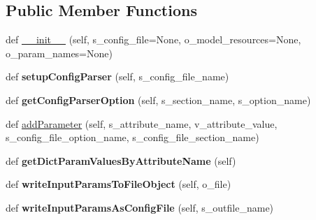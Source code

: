 \subsection*{Public Member Functions}
\begin{DoxyCompactItemize}
\item 
def \hyperlink{classnegui_1_1pginputsimupop_1_1PGInputSimuPop_a1452a83a005c9d30e778b34ae67a399f}{\+\_\+\+\_\+init\+\_\+\+\_\+} (self, s\+\_\+config\+\_\+file=None, o\+\_\+model\+\_\+resources=None, o\+\_\+param\+\_\+names=None)
\item 
def {\bfseries setup\+Config\+Parser} (self, s\+\_\+config\+\_\+file\+\_\+name)\hypertarget{classnegui_1_1pginputsimupop_1_1PGInputSimuPop_a3f1295816cd5e708646d49e1d4f3fb1c}{}\label{classnegui_1_1pginputsimupop_1_1PGInputSimuPop_a3f1295816cd5e708646d49e1d4f3fb1c}

\item 
def {\bfseries get\+Config\+Parser\+Option} (self, s\+\_\+section\+\_\+name, s\+\_\+option\+\_\+name)\hypertarget{classnegui_1_1pginputsimupop_1_1PGInputSimuPop_abe1cda382edb5f59e3c01f2bee5b63c8}{}\label{classnegui_1_1pginputsimupop_1_1PGInputSimuPop_abe1cda382edb5f59e3c01f2bee5b63c8}

\item 
def \hyperlink{classnegui_1_1pginputsimupop_1_1PGInputSimuPop_aa990ef0c582a28a456a355a4eb3af2b9}{add\+Parameter} (self, s\+\_\+attribute\+\_\+name, v\+\_\+attribute\+\_\+value, s\+\_\+config\+\_\+file\+\_\+option\+\_\+name, s\+\_\+config\+\_\+file\+\_\+section\+\_\+name)
\item 
def {\bfseries get\+Dict\+Param\+Values\+By\+Attribute\+Name} (self)\hypertarget{classnegui_1_1pginputsimupop_1_1PGInputSimuPop_a099e2f01dabe86e713df7519a08fecca}{}\label{classnegui_1_1pginputsimupop_1_1PGInputSimuPop_a099e2f01dabe86e713df7519a08fecca}

\item 
def {\bfseries write\+Input\+Params\+To\+File\+Object} (self, o\+\_\+file)\hypertarget{classnegui_1_1pginputsimupop_1_1PGInputSimuPop_affc2fd6bd54b8f1ed84801b2f7f2da4b}{}\label{classnegui_1_1pginputsimupop_1_1PGInputSimuPop_affc2fd6bd54b8f1ed84801b2f7f2da4b}

\item 
def {\bfseries write\+Input\+Params\+As\+Config\+File} (self, s\+\_\+outfile\+\_\+name)\hypertarget{classnegui_1_1pginputsimupop_1_1PGInputSimuPop_a6264dda65b65dc05f2bb32a1c0be103d}{}\label{classnegui_1_1pginputsimupop_1_1PGInputSimuPop_a6264dda65b65dc05f2bb32a1c0be103d}


\end{DoxyCompactItemize}
